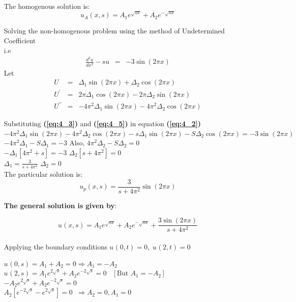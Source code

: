 \documentclass[12pt]{report}
\newcommand{\sbracket}[1]{\left[#1\right]}
\newcommand{\Un}[2]{u_{#1}(#2)}
\newcommand{\NI}{\noindent}
\newcommand{\Dtl}[1]{\Delta_{#1}}
\newcommand{\bt}[1]{\textbf{#1}}
\newcommand{\refn}[1]{\bt{(\ref{#1})}}
\begin{document}
\NI The homogenous solution is: \\[0.2cm]
\begin{equation}
	\Un{A}{x,s} = A_{1}e^{\sqrt{sx}} + A_{2}e^{-\sqrt{sx}}
\end{equation}

\NI Solving the non-homogenous problem using the method of Undetermined Coefficient \\[0.2cm]
i.e
\begin{eqnarray}
	\frac{d^{2}u}{dx^{2}} - su &=& - 3\sin(2\pi x) \label{eq:4_2}
\end{eqnarray}
Let
\begin{eqnarray}
	U &=& \Delta_{1}\sin(2\pi x) + \Delta_{2}\cos(2\pi x) \label{eq:4_3}\\
	U^{\prime} &=& 2\pi \Delta_{1}\cos(2\pi x) - 2\pi \Delta_{2}\sin(2\pi x)\label{eq:4_4}\\
	U^{\prime\prime} &=& -4\pi^{2} \Delta_{1}\sin(2\pi x) - 4\pi^2\Delta_2\cos(2\pi x)\label{eq:4_5}
\end{eqnarray}

\NI Substituting \refn{eq:4_3} and \refn{eq:4_5} in equation \refn{eq:4_2} \\[0.2cm]
$-4\pi^{2}\Dtl{1}\sin(2\pi x) - 4\pi^{2}\Dtl{2}\cos(2\pi x) - s\Dtl{1}\sin(2\pi x) - S\Dtl{2}\cos(2\pi x) = -3\sin(2\pi x)$ \\[0.2cm]
$-4\pi^{2}\Dtl{1} - S\Dtl{1} = - 3$  \quad \quad \quad Also, $4\pi^{2}\Dtl{2} - S\Dtl{2} = 0$ \\[0.2cm]
$-\Dtl{1}\sbracket{4\pi^{2} + s} = - 3 $ \quad \quad \quad \quad \quad \quad $\Dtl{2}\sbracket{s + 4\pi^{2}} = 0$ \\[0.2cm]
$\Dtl{1} = \displaystyle \frac{3}{s + 4\pi^{2}} $ \quad \quad \quad \quad \quad \quad \quad  \quad \quad $\Dtl{2} = 0$ \\[0.2cm]

\NI The particular solution is:\\
$$\Un{p}{x,s} = \frac{3}{s + 4\pi^{2}}\sin(2\pi x) $$

\NI  \textbf{The general solution is given by}:

$$\Un{}{x,s} = A_{1}e^{\sqrt{sx}} + A_{2}e^{-\sqrt{sx}} + \frac{3\sin(2\pi x)}{s + 4\pi^{2}}$$ \\[0.5cm]

\NI Applying the boundary conditions $\Un{}{0,t} = 0, \; \Un{}{2,t} = 0$

\NI $\displaystyle \Un{}{0,s} = A_1 + A_2 = 0 \Rightarrow A_1 = - A_2$\\[0.2cm]
\NI $\displaystyle \Un{}{2,s} = A_{1}e^{2\sqrt{s}} + A_{2}e^{-2\sqrt{s}} = 0 \; \; \; \sbracket{\text{But } A_1 = - A_2}$\\[0.2cm]
$\displaystyle - A_2e^{2\sqrt{s}} + A_2e^{-2\sqrt{s}} = 0$\\[0.2cm]
$\displaystyle A_{2}\sbracket{e^{-2\sqrt{s}} - e^{2\sqrt{s}}} = 0 \; \; \Rightarrow A_2 = 0, A_1 = 0$\\[0.2cm]
\end{document}
